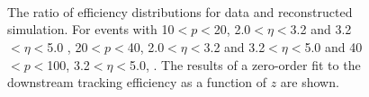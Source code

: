 \begin{figure}
\begin{center}
\vspace*{-1.5cm}
\\
\\
\\
  

\end{center}
 
\caption{The ratio of efficiency distributions for data and reconstructed simulation. For events with 10$<p<$20\gevc, 2.0$<\eta<$3.2 \protect{} and 3.2$<\eta<$5.0 \protect{}, 20$<p<$40\gevc, 2.0$<\eta<$3.2 \protect{} and 3.2$<\eta<$5.0 \protect{} and 40$<p<$100\gevc, 3.2$<\eta<$5.0\gevc, \protect{}. The results of a zero-order fit to the downstream tracking efficiency as a function of $z$ are shown.}
  \label{fig:effrat}
\end{figure}


  

